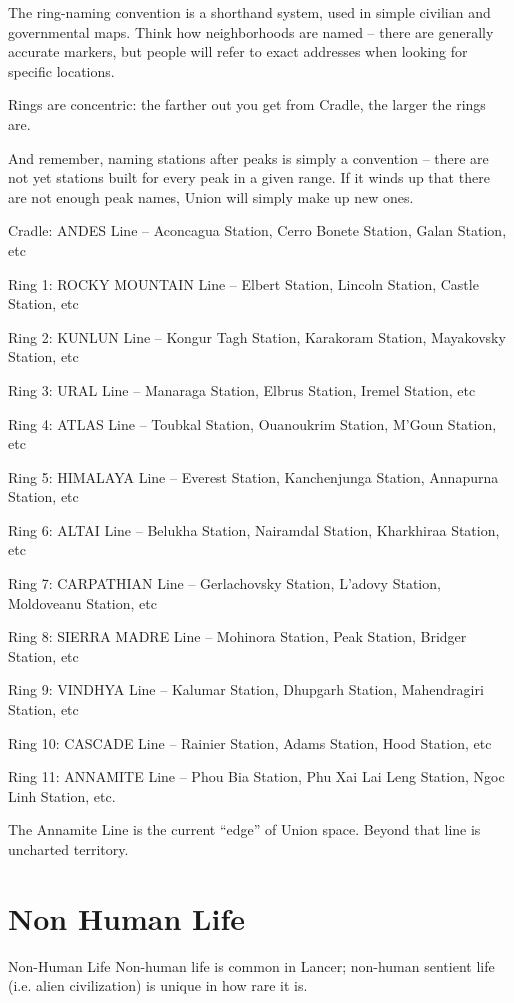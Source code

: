 The ring-naming convention is a shorthand system, used in simple civilian and governmental  
maps. Think how neighborhoods are named -- there are generally accurate markers, but people  
will refer to exact addresses when looking for specific locations.   

Rings are concentric: the farther out you get from Cradle, the larger the rings are.   

And remember, naming stations after peaks is simply a convention -- there are not yet stations  
built for every peak in a given range. If it winds up that there are not enough peak names, Union  
will simply make up new ones. 
 

Cradle: ANDES  Line -- Aconcagua Station, Cerro Bonete Station, Galan Station, etc
 

Ring 1: ROCKY MOUNTAIN Line -- Elbert Station, Lincoln Station, Castle Station, etc
 

Ring 2: KUNLUN Line -- Kongur Tagh Station, Karakoram Station, Mayakovsky Station, etc 
 

Ring 3: URAL Line -- Manaraga Station, Elbrus Station, Iremel Station, etc
 

Ring 4: ATLAS  Line -- Toubkal Station, Ouanoukrim Station, M’Goun Station, etc
 

Ring 5: HIMALAYA Line -- Everest Station, Kanchenjunga Station, Annapurna Station, etc
 

Ring 6: ALTAI  Line -- Belukha Station, Nairamdal Station, Kharkhiraa Station, etc 
 

                                                                                                           


Ring 7: CARPATHIAN Line -- Gerlachovsky Station, L’adovy Station, Moldoveanu Station, etc
 

Ring 8: SIERRA MADRE Line -- Mohinora Station, Peak Station, Bridger Station, etc
 

Ring 9: VINDHYA Line -- Kalumar Station, Dhupgarh Station, Mahendragiri Station, etc
 

Ring 10: CASCADE Line -- Rainier Station, Adams Station, Hood Station, etc
 

Ring 11: ANNAMITE  Line -- Phou Bia Station, Phu Xai Lai Leng Station, Ngoc Linh Station, etc. 
 

The Annamite Line is the current “edge” of Union space. Beyond that line is uncharted territory.  
 
\section{Non Human Life}
Non-Human Life  
Non-human life is common in Lancer; non-human sentient life (i.e. alien civilization) is unique in  
how rare it is. 
 

